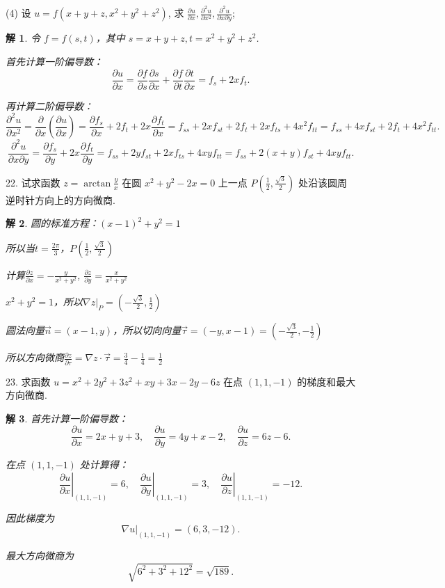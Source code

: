 \documentclass[a4paper,12pt]{article}
\newtheorem*{sol}{解}
\begin{document}
(4) 设 $u = f(x + y + z, x^2 + y^2 + z^2)$, 求 $\frac{\partial u}{\partial x}, \frac{\partial^2 u}{\partial x^2}, \frac{\partial^2 u}{\partial x\partial y}$;
\begin{sol}
    令 $f = f(s,t)$，其中 $s = x + y + z, t = x^2 + y^2 + z^2$.

    首先计算一阶偏导数：
    $$
        \frac{\partial u}{\partial x}
        = \frac{\partial f}{\partial s}\frac{\partial s}{\partial x}
        + \frac{\partial f}{\partial t}\frac{\partial t}{\partial x}
        = f_s + 2x f_t.
    $$

    再计算二阶偏导数：
    $$
        \frac{\partial^2 u}{\partial x^2}
        = \frac{\partial}{\partial x}\left(\frac{\partial u}{\partial x}\right)
        = \frac{\partial f_s}{\partial x} + 2f_t + 2x\frac{\partial f_t}{\partial x}
        = f_{ss} + 2x f_{st} + 2f_t + 2x f_{ts} + 4x^2 f_{tt}
        = f_{ss} + 4x f_{st} + 2f_t + 4x^2 f_{tt}.
    $$
    $$
        \frac{\partial^2 u}{\partial x\partial y}
        = \frac{\partial f_s}{\partial y} + 2x\frac{\partial f_t}{\partial y}
        = f_{ss} + 2y f_{st} + 2x f_{ts} + 4xy f_{tt}
        = f_{ss} + 2(x+y)f_{st} + 4xy f_{tt}.
    $$
\end{sol}


22. 试求函数 $z = \arctan \frac{y}{x}$ 在圆 $x^2 + y^2 - 2x = 0$ 上一点 $P\left( \frac{1}{2}, \frac{\sqrt{3}}{2} \right)$ 处沿该圆周逆时针方向上的方向微商.
\begin{sol}
    圆的标准方程：$(x-1)^2 + y^2 = 1$

    所以当$t=\frac{2\pi}{3}$，$P(\frac{1}{2}, \frac{\sqrt{3}}{2})$

    计算$\frac{\partial z}{\partial x}=-\frac{y}{x^2+y^2}$, $\frac{\partial z}{\partial y}=\frac{x}{x^2+y^2}$

    $x^2+y^2=1$，所以$\nabla z|_P=(-\frac{\sqrt{3}}{2},\frac{1}{2})$

    圆法向量$\overrightarrow{n}=(x-1,y)$，所以切向向量$\overrightarrow{\tau}=(-y,x-1)=(-\frac{\sqrt{3}}{2},-\frac{1}{2})$

    所以方向微商$\frac{\partial z}{\partial\tau}=\nabla z\cdot\overrightarrow{\tau}=\frac{3}{4}-\frac{1}{4}=\frac{1}{2}$
\end{sol}


23. 求函数 $u = x^2 + 2y^2 + 3z^2 + xy + 3x - 2y - 6z$ 在点 $(1,1,-1)$ 的梯度和最大方向微商.
\begin{sol}
    首先计算一阶偏导数：
    $$
        \frac{\partial u}{\partial x} = 2x + y + 3, \quad
        \frac{\partial u}{\partial y} = 4y + x - 2, \quad
        \frac{\partial u}{\partial z} = 6z - 6.
    $$

    在点 $(1,1,-1)$ 处计算得：
    $$
        \left.\frac{\partial u}{\partial x}\right|_{(1,1,-1)} = 6, \quad
        \left.\frac{\partial u}{\partial y}\right|_{(1,1,-1)} = 3, \quad
        \left.\frac{\partial u}{\partial z}\right|_{(1,1,-1)} = -12.
    $$

    因此梯度为
    $$
        \nabla u|_{(1,1,-1)} = (6, 3, -12).
    $$

    最大方向微商为
    $$
        \sqrt{6^2 + 3^2 + 12^2} = \sqrt{189}.
    $$
\end{sol}
\end{document}
